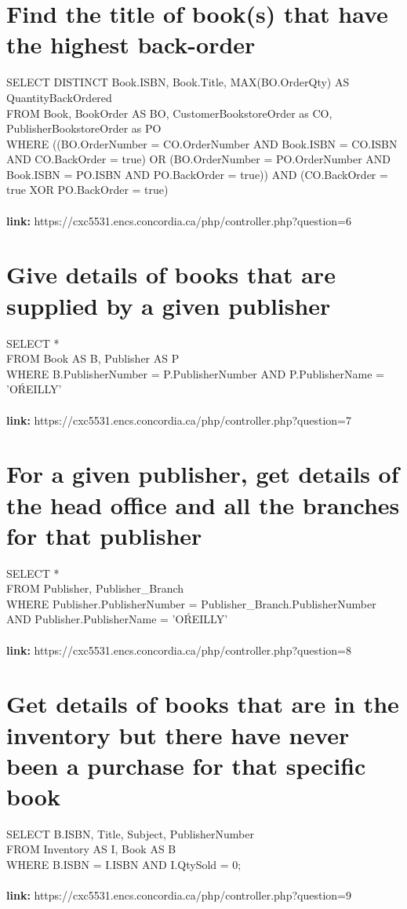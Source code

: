 \documentclass{scrreprt}
\begin{document}
\section{Find the title of book(s) that have the highest back-order}
 SELECT DISTINCT Book.ISBN, Book.Title, MAX(BO.OrderQty) AS QuantityBackOrdered\\
		FROM Book, BookOrder AS BO, CustomerBookstoreOrder as CO, PublisherBookstoreOrder as PO\\
		WHERE ((BO.OrderNumber = CO.OrderNumber AND Book.ISBN = CO.ISBN AND CO.BackOrder = true) OR
       		(BO.OrderNumber = PO.OrderNumber AND Book.ISBN = PO.ISBN AND PO.BackOrder = true)) AND (CO.BackOrder = true XOR PO.BackOrder = true) 
\\\\\textbf{link:} https://cxc5531.encs.concordia.ca/php/controller.php?question=6
\section{Give details of books that are supplied by a given publisher}
 SELECT * \\FROM Book AS B, Publisher AS P\\
            WHERE B.PublisherNumber = P.PublisherNumber
            AND P.PublisherName = 'O\'REILLY'  
\\\\\textbf{link:} https://cxc5531.encs.concordia.ca/php/controller.php?question=7
\section{For a given publisher, get details of the head office and all the branches for that publisher}
 SELECT * \\FROM Publisher, Publisher_Branch\\
            WHERE Publisher.PublisherNumber = Publisher_Branch.PublisherNumber
            AND Publisher.PublisherName = 'O\'REILLY'  
\\\\\textbf{link:} https://cxc5531.encs.concordia.ca/php/controller.php?question=8
\section{Get details of books that are in the inventory but there have never been a purchase for that specific book}
 SELECT B.ISBN, Title, Subject, PublisherNumber\\
            FROM Inventory AS I,
            Book AS B\\
            WHERE B.ISBN = I.ISBN AND I.QtySold = 0;  
\\\\\textbf{link:} https://cxc5531.encs.concordia.ca/php/controller.php?question=9
\end{document}
